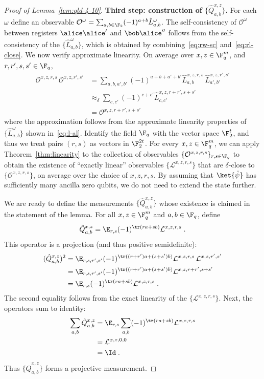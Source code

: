 \begin{proof}[Proof of Lemma~\ref{lem:qld-4-10}]
	\textbf{Third step: construction of $\{ \hat{Q}^{x,z}_{a,b} \}$.}
	For each $\omega$ define an observable $\mathcal{O}^\omega = \sum_{a,b \in \F_2} (-1)^{a+ b} \hat{L}^\omega_{a,b}$.  The self-consistency of $\mathcal{O}^\omega$ between registers $\alice \alice'$ and $\bob \alice''$ follows from the self-consistency of the $\{ \hat{L}^\omega_{a,b} \}$, which is obtained by combining~\eqref{eq:rw-sc} and~\eqref{eq:rl-close}. We now verify approximate linearity. On average over $x,z \in \F_q^m$, and $r,r',s,s' \in \F_q$, 
	\begin{align*}
		\mathcal{O}^{x,z,r,s} \, \mathcal{O}^{x,z,r',s'} &= \sum_{a,b,a',b'} (-1)^{a + b + a' + b'} \hat{L}^{x,z,r,s}_{a,b} \, \hat{L}^{x,z,r',s'}_{a',b'} \\
		&\approx_\delta \sum_{c,c'} (-1)^{c+c'} \hat{L}^{x,z,r+r',s+s'}_{c,c'} \\
		&= \mathcal{O}^{x,z,r+r',s+s'}\,
	\end{align*}
	where the approximation follows from the approximate linearity properties of $\{ \hat{L}^\omega_{a,b} \}$ shown in~\eqref{eq:l-al}.
	Identify the field $\F_q$ with the vector space $\F_2^t$, and thus we treat pairs $(r,s)$ as vectors in $\F_2^{2t}$. For every $x,z \in \F_q^m$, we can apply Theorem~\ref{thm:linearity} to the collection of observables $\{ \mathcal{O}^{x,z,r,s} \}_{r,s \in \F_q}$ to obtain the existence of ``{exactly linear}'' observables $\{ \mathcal{L}^{x,z,r,s} \}$ that are $\delta$-close to $\{ \mathcal{O}^{x,z,r,s} \}$, on average over the choice of $x,z,r,s$. By assuming that $\ket{\hat{\psi}}$ has sufficiently many ancilla zero qubits, we do not need to extend the state further. 
	
	We are ready to define the measurements $\{\hat{Q}^{x,z}_{a,b} \}$ whose existence is claimed in the statement of the lemma. For all $x,z\in \F_q^m$ and $a,b \in \F_q$, define
	\[
		\hat{Q}^{x,z}_{a,b} = \E_{r,s} (-1)^{\tr(ra + sb)} \mathcal{L}^{x,z,r,s}\;.
	\]
	This operator is a projection (and thus positive semidefinite):
	\begin{align*}
	(\hat{Q}^{x,z}_{a,b})^2 &= \E_{r,s,r',s'} (-1)^{\tr((r+r')a + (s+s')b)} \mathcal{L}^{x,z,r,s} \, \mathcal{L}^{x,z,r',s'}\\ 
	&= \E_{r,s,r',s'} (-1)^{\tr((r+r')a + (s+s')b)} \mathcal{L}^{x,z,r+r',s+s'} \\
	&= \E_{r,s} (-1)^{\tr(ra + sb)}  \mathcal{L}^{x,z,r,s}\;.
	\end{align*}
	The second equality follows from the exact linearity of the $\{ \mathcal{L}^{x,z,r,s} \}$. Next, the operators sum to identity:
	\begin{align*}
		\sum_{a,b} \hat{Q}^{x,z}_{a,b} &= \E_{r,s} \sum_{a,b} (-1)^{\tr(ra + sb)} \mathcal{L}^{x,z,r,s} \\
		&= \mathcal{L}^{x,z,0,0} \\
		&= \Id\;.
	\end{align*}
	Thus $\{\hat{Q}^{x,z}_{a,b}\}$ forms a projective measurement.
	

\end{proof}
